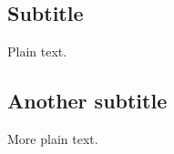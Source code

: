 \documentclass[%
	type=document,%
  	style=article,%
  	media=print,
  	pages=oneside,%
  	prefixLecturer=Dozenten:,
  	author=multiple,
]{unihildesheim}
\begin{document}
\subsection{Subtitle}

Plain text.

\subsection{Another subtitle}

More plain text.
\end{document}

